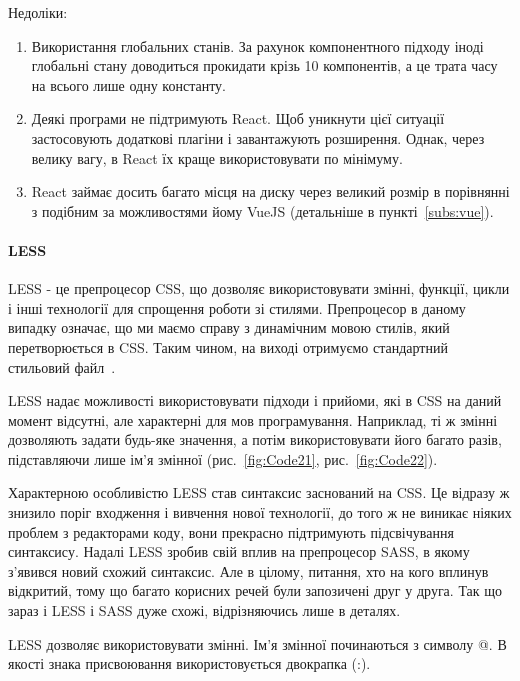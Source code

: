 Недоліки:
\begin{enumerate}
    \item Використання глобальних станів. За рахунок компонентного підходу іноді глобальні стану доводиться прокидати крізь 10 компонентів, а це трата часу на всього лише одну константу. 
    \item Деякі програми не підтримують React. Щоб уникнути цієї ситуації застосовують додаткові плагіни і завантажують розширення. Однак, через велику вагу, в React їх краще використовувати по мінімуму. 
    \item React займає досить багато місця на диску через великий розмір в порівнянні з подібним за можливостями йому VueJS (детальніше в пункті~\ref{subs:vue}).
\end{enumerate}

\paragraph{LESS}

LESS - це препроцесор CSS, що дозволяє використовувати змінні, функції, цикли і інші технології для спрощення роботи зі стилями. Препроцесор в даному випадку означає, що ми маємо справу з динамічним мовою стилів, який перетворюється в CSS. Таким чином, на виході отримуємо стандартний стильовий файл~\cite{9781782160663}.

LESS надає можливості використовувати підходи і прийоми, які в CSS на даний момент відсутні, але характерні для мов програмування. Наприклад, ті ж змінні дозволяють задати будь-яке значення, а потім використовувати його багато разів, підставляючи лише ім'я змінної (рис.~\ref{fig:Code21}, рис.~\ref{fig:Code22}).

Характерною особливістю LESS став синтаксис заснований на CSS. Це відразу ж знизило поріг входження і вивчення нової технології, до того ж не виникає ніяких проблем з редакторами коду, вони прекрасно підтримують підсвічування синтаксису. Надалі LESS зробив свій вплив на препроцесор SASS, в якому з'явився новий схожий синтаксис. Але в цілому, питання, хто на кого вплинув відкритий, тому що багато корисних речей були запозичені друг у друга. Так що зараз і LESS і SASS дуже схожі, відрізняючись лише в деталях.

LESS дозволяє використовувати змінні. Ім'я змінної починаються з символу @. В якості знака присвоювання використовується двокрапка (:).


